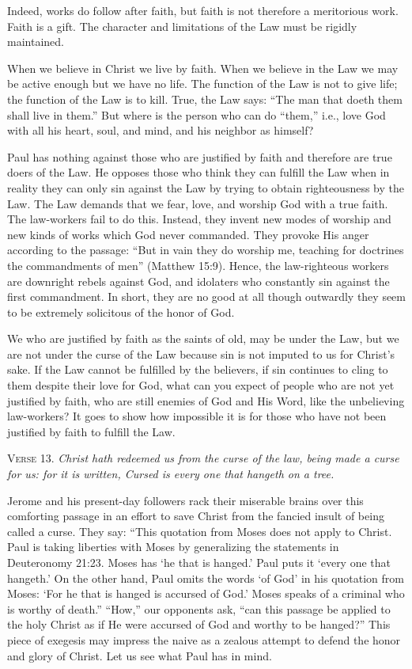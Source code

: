 Indeed, works do follow after faith, but faith is not therefore a meritorious work. Faith is a gift. The character and limitations of the Law must be rigidly maintained.

When we believe in Christ we live by faith. When we believe in the Law we may be active enough but we have no life. The function of the Law is not to give life; the function of the Law is to kill. True, the Law says: “The man that doeth them shall live in them.” But where is the person who can do “them,” i.e., love God with all his heart, soul, and mind, and his neighbor as himself?

Paul has nothing against those who are justified by faith and therefore are true doers of the Law. He opposes those who think they can fulfill the Law when in reality they can only sin against the Law by trying to obtain righteousness by the Law. The Law demands that we fear, love, and worship God with a true faith. The law-workers fail to do this. Instead, they invent new modes of worship and new kinds of works which God never commanded. They provoke His anger according to the passage: “But in vain they do worship me, teaching for doctrines the commandments of men” (Matthew 15:9). Hence, the law-righteous workers are downright rebels against God, and idolaters who constantly sin against the first commandment. In short, they are no good at all though outwardly they seem to be extremely solicitous of the honor of God.

We who are justified by faith as the saints of old, may be under the Law, but we are not under the curse of the Law because sin is not imputed to us for Christ’s sake. If the Law cannot be fulfilled by the believers, if sin continues to cling to them despite their love for God, what can you expect of people who are not yet justified by faith, who are still enemies of God and His Word, like the unbelieving law-workers? It goes to show how impossible it is for those who have not been justified by faith to fulfill the Law.

\textsc{Verse} 13. \emph{Christ hath redeemed us from the curse of the law, being made a curse for us: for it is written, Cursed is every one that hangeth on a tree.}

Jerome and his present-day followers rack their miserable brains over this comforting passage in an effort to save Christ from the fancied insult of being called a curse. They say: “This quotation from Moses does not apply to Christ. Paul is taking liberties with Moses by generalizing the statements in Deuteronomy 21:23. Moses has ‘he that is hanged.’ Paul puts it ‘every one that hangeth.’ On the other hand, Paul omits the words ‘of God’ in his quotation from Moses: ‘For he that is hanged is accursed of God.’ Moses speaks of a criminal who is worthy of death.” “How,” our opponents ask, “can this passage be applied to the holy Christ as if He were accursed of God and worthy to be hanged?” This piece of exegesis may impress the naive as a zealous attempt to defend the honor and glory of Christ. Let us see what Paul has in mind.

